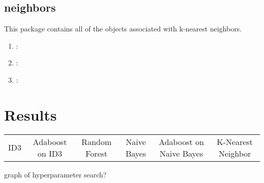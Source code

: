 \documentclass[11pt]{article}
\begin{document}
\subsection{neighbors}
This package contains all of the objects associated with k-nearest neighbors.

\begin{enumerate}
  \item {}:
  \item {}:
  \item {}:
\end{enumerate}

\section{Results}
\begin{tabular}{ |c|c|c|c|c|c| }
  ID3 & Adaboost on ID3 & Random Forest & Naive Bayes & Adaboost on Naive Bayes & K-Nearest Neighbor
\end{tabular}

graph of hyperparameter search?



\end{document}
